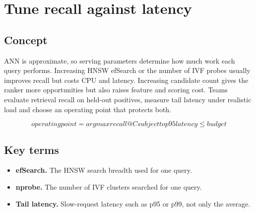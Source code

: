 \section{Tune recall against latency}

\begin{abstract}
Faster search visits less of the index; deeper search recovers more relevant items.
\end{abstract}

\subsection{Concept}
ANN is approximate, so serving parameters determine how much work each query performs. Increasing HNSW efSearch or the number of IVF probes usually improves recall but costs CPU and latency. Increasing candidate count gives the ranker more opportunities but also raises feature and scoring cost. Teams evaluate retrieval recall on held-out positives, measure tail latency under realistic load and choose an operating point that protects both.

\begin{equation*}
operating point = arg max recall@C   subject to p95 latency \le budget
\end{equation*}

\subsection{Key terms}
\begin{itemize}
\item \textbf{efSearch.} The HNSW search breadth used for one query.
\item \textbf{nprobe.} The number of IVF clusters searched for one query.
\item \textbf{Tail latency.} Slow-request latency such as p95 or p99, not only the average.
\end{itemize}
